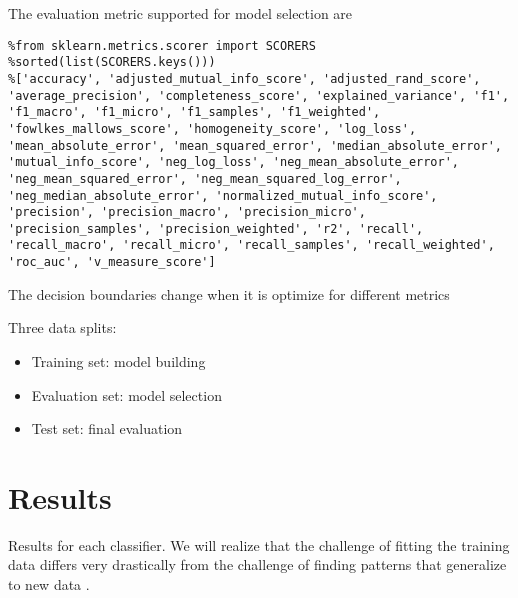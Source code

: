 \documentclass[12pt]{report}
\begin{document}

The evaluation metric supported for model selection are
\begin{lstlisting}
%from sklearn.metrics.scorer import SCORERS
%sorted(list(SCORERS.keys()))
%['accuracy', 'adjusted_mutual_info_score', 'adjusted_rand_score', 'average_precision', 'completeness_score', 'explained_variance', 'f1', 'f1_macro', 'f1_micro', 'f1_samples', 'f1_weighted', 'fowlkes_mallows_score', 'homogeneity_score', 'log_loss', 'mean_absolute_error', 'mean_squared_error', 'median_absolute_error', 'mutual_info_score', 'neg_log_loss', 'neg_mean_absolute_error', 'neg_mean_squared_error', 'neg_mean_squared_log_error', 'neg_median_absolute_error', 'normalized_mutual_info_score', 'precision', 'precision_macro', 'precision_micro', 'precision_samples', 'precision_weighted', 'r2', 'recall', 'recall_macro', 'recall_micro', 'recall_samples', 'recall_weighted', 'roc_auc', 'v_measure_score']
\end{lstlisting}
The decision boundaries change when it is optimize for different metrics

Three data splits:
\begin{itemize}
	\item Training set: model building
	\item Evaluation set: model selection 
	\item Test set: final evaluation
\end{itemize}

\section{Results}
Results for each classifier. We will realize that the challenge of fitting the training data differs very drastically from the challenge of finding patterns that generalize to new data \cite{goodfellow2016deep}.
\end{document}
